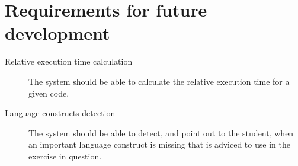 \documentclass{article}
\begin{document}
\section{Requirements for future development}
\begin{description}
  \item[Relative execution time calculation] The system should be able to
    calculate the relative execution time for a given code.
  \item[Language constructs detection] The system should be able to detect, and
    point out to the student, when an important language construct is missing
    that is adviced to use in the exercise in question.
\end{description}
\end{document}
